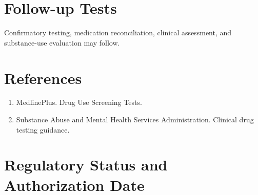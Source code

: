 \section*{Follow-up Tests} Confirmatory testing, medication reconciliation, clinical assessment, and substance-use evaluation may follow.
\section*{References} \begin{enumerate}\item MedlinePlus. Drug Use Screening Tests.\item Substance Abuse and Mental Health Services Administration. Clinical drug testing guidance.\end{enumerate}
\clearpage\section*{Regulatory Status and Authorization Date}\clearpage

